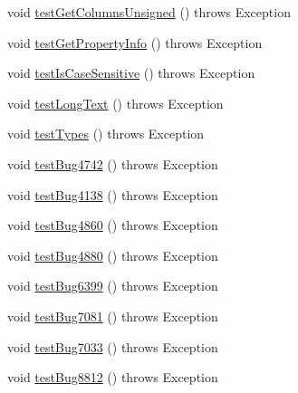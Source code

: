 \begin{DoxyCompactItemize}
\item 
void \mbox{\hyperlink{classtestsuite_1_1regression_1_1_meta_data_regression_test_a04c1681aefa888950a3247f4495100c9}{test\+Get\+Columns\+Unsigned}} ()  throws Exception 
\item 
void \mbox{\hyperlink{classtestsuite_1_1regression_1_1_meta_data_regression_test_a19b374def5386df4eb8d89ef0c85375f}{test\+Get\+Property\+Info}} ()  throws Exception 
\item 
void \mbox{\hyperlink{classtestsuite_1_1regression_1_1_meta_data_regression_test_adb0e8b0fcde945a0ebdfbd318975979b}{test\+Is\+Case\+Sensitive}} ()  throws Exception 
\item 
void \mbox{\hyperlink{classtestsuite_1_1regression_1_1_meta_data_regression_test_abc6512da546efa8175bd8245a997d554}{test\+Long\+Text}} ()  throws Exception 
\item 
void \mbox{\hyperlink{classtestsuite_1_1regression_1_1_meta_data_regression_test_a538c5b4ba85f2b4160bcaa4885f13142}{test\+Types}} ()  throws Exception 
\item 
void \mbox{\hyperlink{classtestsuite_1_1regression_1_1_meta_data_regression_test_aacb167d12465f3fad1e2723a82c2300e}{test\+Bug4742}} ()  throws Exception 
\item 
void \mbox{\hyperlink{classtestsuite_1_1regression_1_1_meta_data_regression_test_a5c0ea954c7204a811055ea0487e75862}{test\+Bug4138}} ()  throws Exception 
\item 
void \mbox{\hyperlink{classtestsuite_1_1regression_1_1_meta_data_regression_test_a9c33a8fd6a670158feb2efa4cbf966ad}{test\+Bug4860}} ()  throws Exception 
\item 
void \mbox{\hyperlink{classtestsuite_1_1regression_1_1_meta_data_regression_test_a5f79cbc323ee6b50a304811b962f4b37}{test\+Bug4880}} ()  throws Exception 
\item 
void \mbox{\hyperlink{classtestsuite_1_1regression_1_1_meta_data_regression_test_ad90f2153ff1faa28e41a28116ad400ca}{test\+Bug6399}} ()  throws Exception 
\item 
void \mbox{\hyperlink{classtestsuite_1_1regression_1_1_meta_data_regression_test_af6e2170c6b9b3b1ff9beddf8dc1c2aa9}{test\+Bug7081}} ()  throws Exception 
\item 
void \mbox{\hyperlink{classtestsuite_1_1regression_1_1_meta_data_regression_test_a810a4101f87e44b30caa45239a86b4d5}{test\+Bug7033}} ()  throws Exception 
\item 
void \mbox{\hyperlink{classtestsuite_1_1regression_1_1_meta_data_regression_test_a2e1523fa5764c3a574ab345132d80ccb}{test\+Bug8812}} ()  throws Exception 

\end{DoxyCompactItemize}

